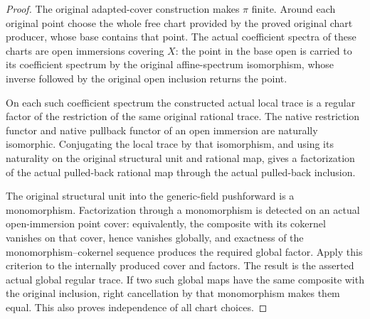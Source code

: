 \begin{proof}
The original adapted-cover construction makes $\pi$ finite. Around each
original point choose the whole free chart provided by the proved
original chart producer, whose base contains that point. The actual
coefficient spectra of these charts are open immersions covering $X$:
the point in the base open is carried to its coefficient spectrum by
the original affine-spectrum isomorphism, whose inverse followed by
the original open inclusion returns the point.

On each such coefficient spectrum the constructed actual local trace
is a regular factor of the restriction of the same original rational
trace. The native restriction functor and native pullback functor of
an open immersion are naturally isomorphic. Conjugating the local
trace by that isomorphism, and using its naturality on the original
structural unit and rational map, gives a factorization of the actual
pulled-back rational map through the actual pulled-back inclusion.

The original structural unit into the generic-field pushforward is a
monomorphism. Factorization through a monomorphism is detected on an
actual open-immersion point cover: equivalently, the composite with its
cokernel vanishes on that cover, hence vanishes globally, and exactness
of the monomorphism--cokernel sequence produces the required global
factor. Apply this criterion to the internally produced cover and
factors. The result is the asserted actual global regular trace. If
two such global maps have the same composite with the original
inclusion, right cancellation by that monomorphism makes them equal.
This also proves independence of all chart choices.
\end{proof}
